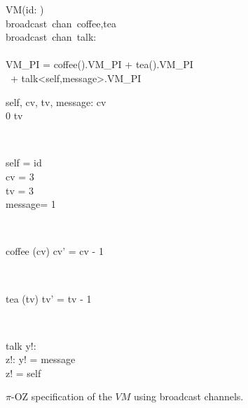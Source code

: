 \begin{figure}[H]
\centering
\begin{class}{VM(id: \integer)}
\ 
\\broadcast\ chan\ coffee,tea
\ 
\\broadcast\ chan\ talk:\integer \times \integer
\ \\ \
\\VM\_PI = coffee().VM\_PI + tea().VM\_PI 
\\ \ \qquad \qquad + talk<self,message>.VM\_PI
\\
\begin{state}
self, cv, tv, message: \integer
{} \leq  cv 
\\
0 \leq  tv 
\end{state} 
\\
\begin{init}
self = id
\\cv = 3
\\tv = 3
\\ message= 1
\end{init} 
\\
\begin{op}{coffee}
\Delta (cv)
\ST
cv' = cv - 1
\end{op}
\\
\begin{op}{tea}
\Delta (tv)
\ST
tv' = tv - 1
\end{op}
\\
\begin{op}{talk}
y!: \integer
\\z!: \integer
\ST
y! = message
\\z! = self
\end{op}
\end{class}
\caption{$\pi$-OZ specification of the $VM$ using broadcast channels.}
\label{comp_oz_pi_statefull_vm_broadcast}
\end{figure}
